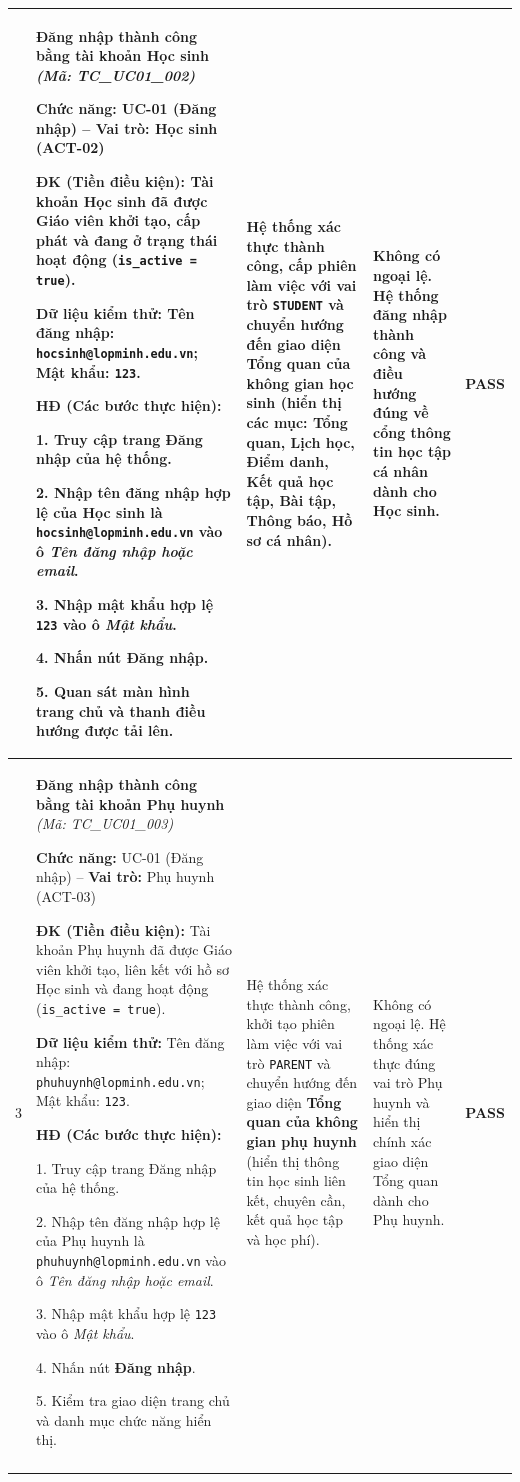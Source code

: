 \documentclass[12pt,a4paper]{report}
\newcommand{\passbadge}{\textbf{\textcolor{passgreen}{PASS}}}
\newcommand{\tcheader}[2]{%
  \textbf{#1} \textit{(Mã: #2)}\par
}
\newcommand{\tcmeta}[2]{%
  \textbf{Chức năng:} #1 -- \textbf{Vai trò:} #2\par
}
\newcommand{\tcpre}[1]{%
  \textbf{ĐK (Tiền điều kiện):} #1\par
}
\newcommand{\tcdata}[1]{%
  \textbf{Dữ liệu kiểm thử:} #1\par
}
\begin{document}
{\begin{longtable}{|C{0.8cm}|L{6.8cm}|L{3.0cm}|L{2.9cm}|C{1.2cm}|}
{%
2 &
\tcheader{Đăng nhập thành công bằng tài khoản Học sinh}{TC\_UC01\_002}
\tcmeta{UC-01 (Đăng nhập)}{Học sinh (ACT-02)}
\tcpre{Tài khoản Học sinh đã được Giáo viên khởi tạo, cấp phát và đang ở trạng thái hoạt động (\texttt{is\_active = true}).}
\tcdata{Tên đăng nhập: \texttt{hocsinh@\allowbreak lopminh.edu.vn}; Mật khẩu: \texttt{123}.}
\textbf{HĐ (Các bước thực hiện):}\par
1. Truy cập trang Đăng nhập của hệ thống.\par
2. Nhập tên đăng nhập hợp lệ của Học sinh là \texttt{hocsinh@\allowbreak lopminh.edu.vn} vào ô \textit{Tên đăng nhập hoặc email}.\par
3. Nhập mật khẩu hợp lệ \texttt{123} vào ô \textit{Mật khẩu}.\par
4. Nhấn nút \textbf{Đăng nhập}.\par
5. Quan sát màn hình trang chủ và thanh điều hướng được tải lên.
&
Hệ thống xác thực thành công, cấp phiên làm việc với vai trò \texttt{STUDENT} và chuyển hướng đến giao diện \textbf{Tổng quan của không gian học sinh} (hiển thị các mục: Tổng quan, Lịch học, Điểm danh, Kết quả học tập, Bài tập, Thông báo, Hồ sơ cá nhân).
&
Không có ngoại lệ. Hệ thống đăng nhập thành công và điều hướng đúng về cổng thông tin học tập cá nhân dành cho Học sinh.
&
\passbadge \\
\hline

3 &
\tcheader{Đăng nhập thành công bằng tài khoản Phụ huynh}{TC\_UC01\_003}
\tcmeta{UC-01 (Đăng nhập)}{Phụ huynh (ACT-03)}
\tcpre{Tài khoản Phụ huynh đã được Giáo viên khởi tạo, liên kết với hồ sơ Học sinh và đang hoạt động (\texttt{is\_active = true}).}
\tcdata{Tên đăng nhập: \texttt{phuhuynh@\allowbreak lopminh.edu.vn}; Mật khẩu: \texttt{123}.}
\textbf{HĐ (Các bước thực hiện):}\par
1. Truy cập trang Đăng nhập của hệ thống.\par
2. Nhập tên đăng nhập hợp lệ của Phụ huynh là \texttt{phuhuynh@\allowbreak lopminh.edu.vn} vào ô \textit{Tên đăng nhập hoặc email}.\par
3. Nhập mật khẩu hợp lệ \texttt{123} vào ô \textit{Mật khẩu}.\par
4. Nhấn nút \textbf{Đăng nhập}.\par
5. Kiểm tra giao diện trang chủ và danh mục chức năng hiển thị.
&
Hệ thống xác thực thành công, khởi tạo phiên làm việc với vai trò \texttt{PARENT} và chuyển hướng đến giao diện \textbf{Tổng quan của không gian phụ huynh} (hiển thị thông tin học sinh liên kết, chuyên cần, kết quả học tập và học phí).
&
Không có ngoại lệ. Hệ thống xác thực đúng vai trò Phụ huynh và hiển thị chính xác giao diện Tổng quan dành cho Phụ huynh.
&
\passbadge \\
\hline

}
\end{longtable}}
\end{document}
